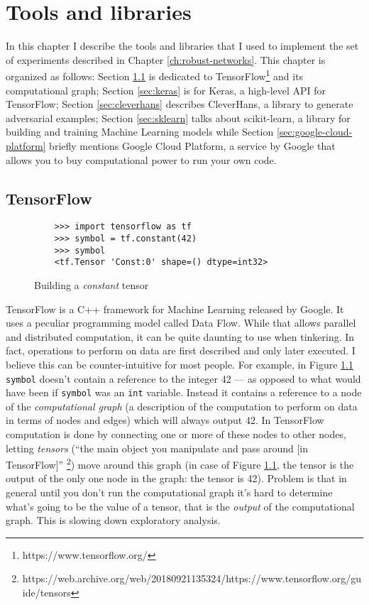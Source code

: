 \chapter{Tools and libraries}
\label{ch:tools-and-libraries}

In this chapter I describe the tools and libraries that I used to
implement the set of experiments described in Chapter
\ref{ch:robust-networks}. This chapter is organized as follows: Section
\ref{sec:tensorflow} is dedicated to
TensorFlow\footnote{https://www.tensorflow.org/} and its computational
graph; Section \ref{sec:keras} is for Keras, a high-level API for
TensorFlow; Section \ref{sec:cleverhans} describes CleverHans, a
library to generate adversarial examples; Section \ref{sec:sklearn}
talks about scikit-learn, a library for building and training Machine
Learning models while Section \ref{sec:google-cloud-platform} briefly
mentions Google Cloud Platform, a service by Google that allows you to
buy computational power to run your own code.

\section{TensorFlow}
\label{sec:tensorflow}

\begin{figure}
  \begin{verbatim}
    >>> import tensorflow as tf
    >>> symbol = tf.constant(42)
    >>> symbol
    <tf.Tensor 'Const:0' shape=() dtype=int32>
  \end{verbatim}
  \caption{Building a \emph{constant} tensor}
  \label{fig:fortytwo}
\end{figure}

TensorFlow is a C++ framework for Machine Learning released by Google.
It uses a peculiar programming model called Data Flow. While that
allows parallel and distributed computation, it can be quite daunting
to use when tinkering. In fact, operations to perform on data are first
described and only later executed. I believe this can be
counter-intuitive for most people. For example, in Figure
\ref{fig:fortytwo} \texttt{symbol} doesn't contain a reference to the
integer 42 --- as opposed to what would have been if \texttt{symbol} was
an \texttt{int} variable. Instead it contains a reference to a node of
the \emph{computational graph} (a description of the computation to
perform on data in terms of nodes and edges) which will always output
42. In TensorFlow computation is done by connecting one or more of
these nodes to other nodes, letting \emph{tensors} (``the main object
you manipulate and pass around [in TensorFlow]''%
\footnote{https://web.archive.org/web/20180921135324/https://www.tensorflow.org/guide/tensors})
move around this graph (in case of Figure \ref{fig:fortytwo}, the
tensor is the output of the only one node in the graph: the tensor is
42). Problem is that in general until you don't run the computational
graph it's hard to determine what's going to be the value of a tensor,
that is the \emph{output} of the computational graph. This is slowing
down exploratory analysis.

